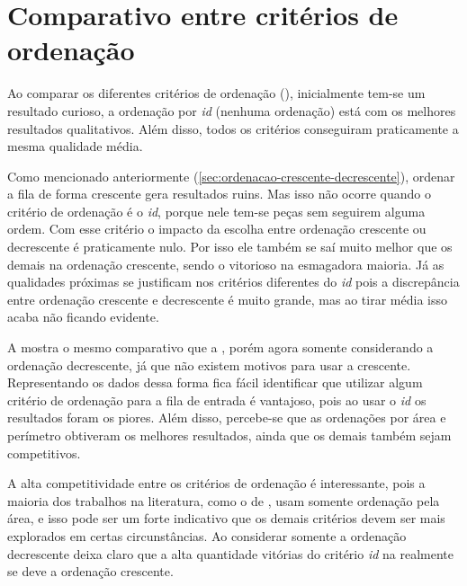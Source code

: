 \section{Comparativo entre critérios de ordenação}\label{sec:comparativo-entre-criterios-de-ordenacao}

Ao comparar os diferentes critérios de ordenação (), inicialmente tem-se
um resultado curioso, a ordenação por \textit{id} (nenhuma ordenação) está com os melhores
resultados qualitativos.
Além disso, todos os critérios conseguiram praticamente a mesma qualidade média.



Como mencionado anteriormente (\cref{sec:ordenacao-crescente-decrescente}), ordenar a fila de
forma crescente gera resultados ruins.
Mas isso não ocorre quando o critério de ordenação é o \textit{id}, porque nele tem-se peças
sem seguirem alguma ordem.
Com esse critério o impacto da escolha entre ordenação crescente ou decrescente é praticamente
nulo.
Por isso ele também se saí muito melhor que os demais na ordenação crescente, sendo o vitorioso
na esmagadora maioria.
Já as qualidades próximas se justificam nos critérios diferentes do \textit{id} pois a
discrepância entre ordenação crescente e decrescente é muito grande, mas ao tirar média isso acaba
não ficando evidente.

A  mostra o mesmo comparativo que a , porém agora
somente considerando a ordenação decrescente, já que não existem motivos para usar a crescente.
Representando os dados dessa forma fica fácil identificar que utilizar algum critério de ordenação
para a fila de entrada é vantajoso, pois ao usar o \textit{id} os resultados foram os piores.
Além disso, percebe-se que as ordenações por área e perímetro obtiveram os melhores resultados,
ainda que os demais também sejam competitivos.



A alta competitividade entre os critérios de ordenação é interessante, pois a maioria dos trabalhos
na literatura, como o de , usam somente ordenação pela área, e
isso pode ser um forte indicativo que os demais critérios devem ser mais explorados em certas
circunstâncias.
Ao considerar somente a ordenação decrescente deixa claro que a alta quantidade vitórias do critério
\textit{id} na  realmente se deve a ordenação crescente.
